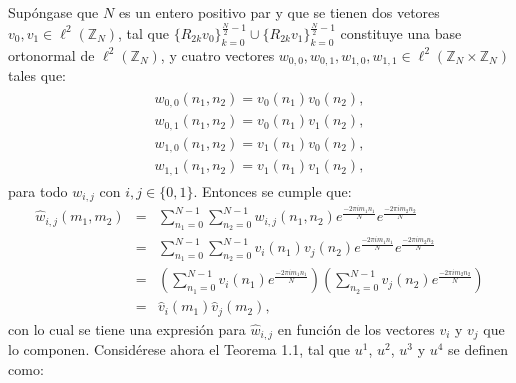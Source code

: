 \par Sup\'ongase que $N$ es un entero positivo par y que se tienen dos vetores\linebreak $v_0,v_1\in \ell^2(\mathbb{Z}_N)$, tal que $\{R_{2k}v_0\}_{k=0}^{\frac{N}{2}-1}\cup\{R_{2k}v_1\}_{k=0}^{\frac{N}{2}-1}$ constituye una base ortonormal de $\ell^2(\mathbb{Z}_N)$, y cuatro vectores $w_{0,0},w_{0,1},w_{1,0},w_{1,1}\in \ell^2(\mathbb{Z}_N\times\mathbb{Z}_N)$ tales que:
\begin{eqnarray}
\begin{array}{c}
w_{0,0}(n_1,n_2)=v_0(n_1)v_0(n_2),\\
w_{0,1}(n_1,n_2)=v_0(n_1)v_1(n_2),\\
w_{1,0}(n_1,n_2)=v_1(n_1)v_0(n_2),\\
w_{1,1}(n_1,n_2)=v_1(n_1)v_1(n_2),
\label{definicion-filtro-2d}
\end{array}
\end{eqnarray}
para todo $w_{i,j}$ con $i,j\in\{0,1\}$. Entonces se cumple que:
\begin{eqnarray}
\hat{w}_{i,j}(m_1,m_2)&=&\sum_{n_1=0}^{N-1}\sum_{n_2=0}^{N-1}w_{i,j}(n_1,n_2)e^{\frac{-2\pi im_1n_1}{N}}e^{\frac{-2\pi im_2n_2}{N}}\nonumber\\
&=&\sum_{n_1=0}^{N-1}\sum_{n_2=0}^{N-1}v_i(n_1)v_j(n_2)e^{\frac{-2\pi im_1n_1}{N}}e^{\frac{-2\pi im_2n_2}{N}}\nonumber\\
&=&\left(\sum_{n_1=0}^{N-1}v_i(n_1)e^{\frac{-2\pi im_1n_1}{N}}\right)\left(\sum_{n_2=0}^{N-1}v_j(n_2)e^{\frac{-2\pi im_2n_2}{N}}\right)\nonumber\\
&=&\hat{v}_i(m_1)\hat{v}_j(m_2),\nonumber
\end{eqnarray}
con lo cual se tiene una expresi\'on para $\hat{w}_{i,j}$ en funci\'on de los vectores $v_i$ y $v_j$ que lo componen. Consid\'erese ahora el Teorema 1.1, tal que $u^1$, $u^2$, $u^3$ y $u^4$ se definen como:
